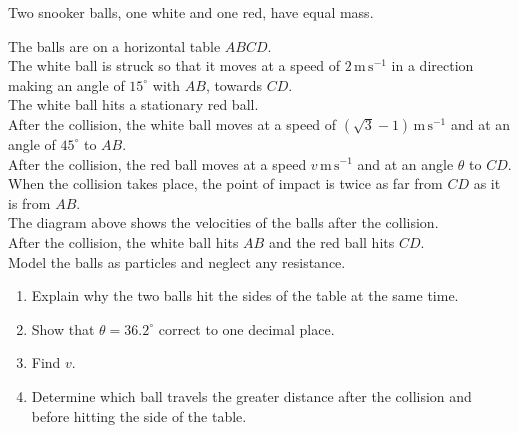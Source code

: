 \documentclass[leqno]{article}
\begin{document}
\begin{enumerate}[
  label=\textbf{\arabic*.},
  leftmargin=*,
  topsep=0pt,
  partopsep=0pt,
  parsep=0pt
]
\begin{figure}[H]
\end{figure}


Two snooker balls, one white and one red, have equal mass.

The balls are on a horizontal table $ABCD$. \\

The white ball is struck so that it moves at a speed of $2\,\mathrm{m\,s^{-1}}$ in a direction making an angle of $15^\circ$ with $AB$, towards $CD$. \\

The white ball hits a stationary red ball. \\

After the collision, the white ball moves at a speed of $(\sqrt{3}-1)\,\mathrm{m\,s^{-1}}$ and at an angle of $45^\circ$ to $AB$. \\

After the collision, the red ball moves at a speed $v\,\mathrm{m\,s^{-1}}$ and at an angle $\theta$ to $CD$. \\

When the collision takes place, the point of impact is twice as far from $CD$ as it is from $AB$. \\

The diagram above shows the velocities of the balls after the collision. \\

After the collision, the white ball hits $AB$ and the red ball hits $CD$. \\

Model the balls as particles and neglect any resistance. \\

\begin{enumerate}[label=\textbf{(\alph*)}]
  \item Explain why the two balls hit the sides of the table at the same time.  \\
  \item Show that $\theta = 36.2^\circ$ correct to one decimal place.  \\
  \item Find $v$.  \\
  \item Determine which ball travels the greater distance after the collision and before hitting the side of the table.


\end{enumerate}
\end{enumerate}
\end{document}
